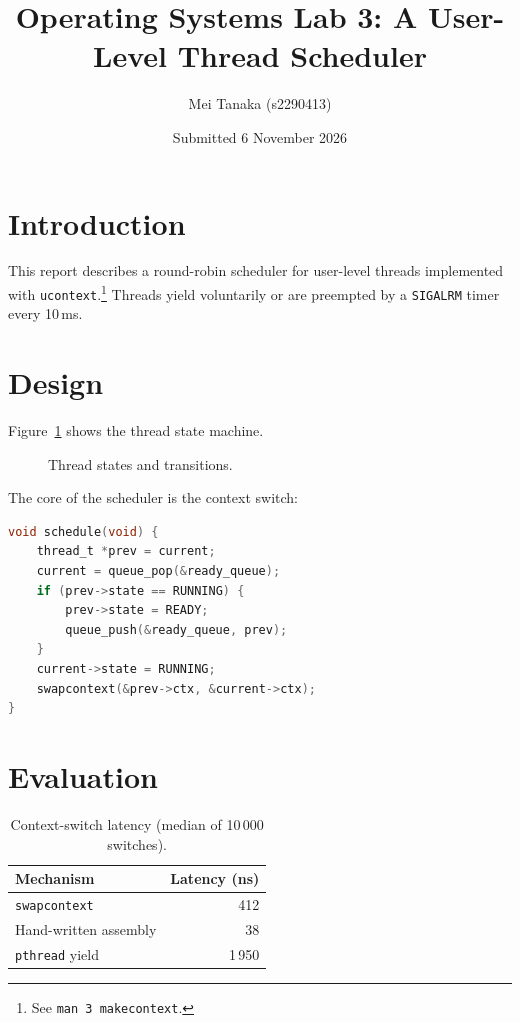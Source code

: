 \documentclass[11pt,a4paper]{article}
\title{Operating Systems Lab 3: A User-Level Thread Scheduler}
\author{Mei Tanaka (s2290413)}
\date{Submitted 6 November 2026}
\begin{document}
\maketitle
\tableofcontents
\listoffigures
\listoftables

\section{Introduction}
This report describes a round-robin scheduler for user-level threads implemented with
\texttt{ucontext}.\footnote{See \texttt{man 3 makecontext}.} Threads yield voluntarily or
are preempted by a \texttt{SIGALRM} timer every 10\,ms.

\section{Design}
Figure~\ref{fig:states} shows the thread state machine.

\begin{figure}[h]
\centering
{}
\caption{Thread states and transitions.}
\label{fig:states}
\end{figure}

The core of the scheduler is the context switch:

\begin{lstlisting}[language=C]
void schedule(void) {
    thread_t *prev = current;
    current = queue_pop(&ready_queue);
    if (prev->state == RUNNING) {
        prev->state = READY;
        queue_push(&ready_queue, prev);
    }
    current->state = RUNNING;
    swapcontext(&prev->ctx, &current->ctx);
}
\end{lstlisting}

\section{Evaluation}
\begin{table}[h]
\centering
\caption{Context-switch latency (median of 10\,000 switches).}
\label{tab:latency}
\begin{tabular}{lr}
\toprule
Mechanism & Latency (ns) \\
\midrule
\texttt{swapcontext} & 412 \\
Hand-written assembly & 38 \\
\texttt{pthread} yield & 1\,950 \\
\bottomrule
\end{tabular}
\end{table}
\end{document}
